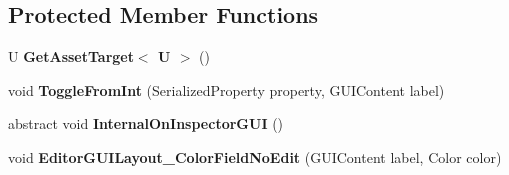 \subsection*{Protected Member Functions}
\begin{DoxyCompactItemize}
\item 
\mbox{\label{class_super_tiled2_unity_1_1_editor_1_1_super_importer_editor_a1b00e7aef31bafabb205fe78b1f75b3e}} 
U {\bfseries Get\+Asset\+Target$<$ U $>$} ()
\item 
\mbox{\label{class_super_tiled2_unity_1_1_editor_1_1_super_importer_editor_ab33661c01d04c709a84d7e325f5f3c30}} 
void {\bfseries Toggle\+From\+Int} (Serialized\+Property property, G\+U\+I\+Content label)
\item 
\mbox{\label{class_super_tiled2_unity_1_1_editor_1_1_super_importer_editor_a0b3334608e4ea2bf17052a863dc9061f}} 
abstract void {\bfseries Internal\+On\+Inspector\+G\+UI} ()
\item 
\mbox{\label{class_super_tiled2_unity_1_1_editor_1_1_super_importer_editor_a5701772117524e8f9abef04e60069fdb}} 
void {\bfseries Editor\+G\+U\+I\+Layout\+\_\+\+Color\+Field\+No\+Edit} (G\+U\+I\+Content label, Color color)
\end{DoxyCompactItemize}
